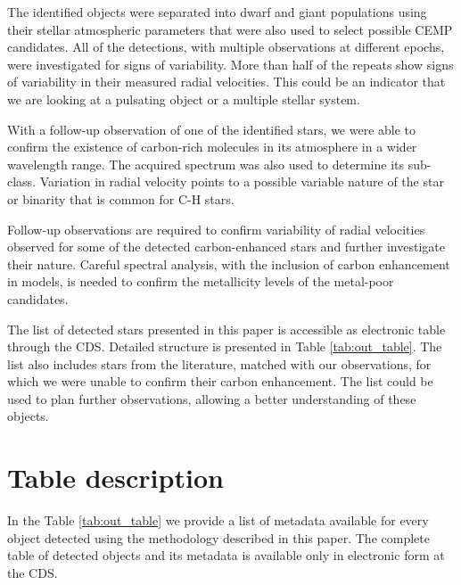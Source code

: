 The identified objects were separated into dwarf and giant populations using their stellar atmospheric parameters that were also used to select possible CEMP candidates. All of the detections, with multiple observations at different epochs, were investigated for signs of variability. More than half of the repeats show signs of variability in their measured radial velocities. This could be an indicator that we are looking at a pulsating object or a multiple stellar system.

With a follow-up observation of one of the identified stars, we were able to confirm the existence of carbon-rich molecules in its atmosphere in a wider wavelength range. The acquired spectrum was also used to determine its sub-class. Variation in radial velocity points to a possible variable nature of the star or binarity that is common for C-H stars.

Follow-up observations are required to confirm variability of radial velocities observed for some of the detected carbon-enhanced stars and further investigate their nature. Careful spectral analysis, with the inclusion of carbon enhancement in models, is needed to confirm the metallicity levels of the metal-poor candidates. 

The list of detected stars presented in this paper is accessible as electronic table through the CDS. Detailed structure is presented in Table \ref{tab:out_table}. The list also includes stars from the literature, matched with our observations, for which we were unable to confirm their carbon enhancement. The list could be used to plan further observations, allowing a better understanding of these objects.


\section{Table description} 
In the Table \ref{tab:out_table} we provide a list of metadata available for every object detected using the methodology described in this paper. The complete table of detected objects and its metadata is available only in electronic form at the CDS.

